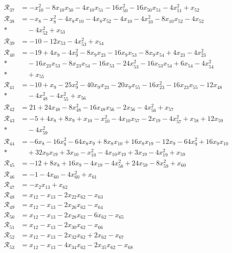 \begin{align*}
\mathcal R_{37} &= -x_{10}^{2} -8x_{10}x_{50} -4x_{10}x_{51} -16x_{50}^{2} -16x_{50}x_{51} -4x_{51}^{2} +x_{52} \\
\mathcal R_{38} &= -x_{8} -x_{8}^{2} -4x_{8}x_{10} -4x_{8}x_{52} -4x_{10} -4x_{10}^{2} -8x_{10}x_{52} -4x_{52} \\*
&\quad -4x_{52}^{2} +x_{53} \\
\mathcal R_{39} &= -10 -12x_{53} -4x_{53}^{2} +x_{54} \\
\mathcal R_{40} &= -19 +4x_{9} -4x_{9}^{2} -8x_{9}x_{23} -16x_{9}x_{53} -8x_{9}x_{54} +4x_{23} -4x_{23}^{2} \\*
&\quad -16x_{23}x_{53} -8x_{23}x_{54} -16x_{53} -24x_{53}^{2} -16x_{53}x_{54} +6x_{54} -4x_{54}^{2} \\*
&\quad +x_{55} \\
\mathcal R_{41} &= -10 +x_{9} -25x_{9}^{2} -40x_{9}x_{23} -20x_{9}x_{55} -16x_{23}^{2} -16x_{23}x_{55} -12x_{48} \\*
&\quad -4x_{48}^{2} -4x_{55}^{2} +x_{56} \\
\mathcal R_{42} &= 21 +24x_{48} -8x_{48}^{2} -16x_{48}x_{56} -2x_{56} -4x_{56}^{2} +x_{57} \\
\mathcal R_{43} &= -5 +4x_{8} +8x_{9} +x_{10} -x_{10}^{2} -4x_{10}x_{57} -2x_{19} -4x_{57}^{2} +x_{58} +12x_{59} \\*
&\quad -4x_{59}^{2} \\
\mathcal R_{44} &= -6x_{8} -16x_{8}^{2} -64x_{8}x_{9} +8x_{8}x_{10} +16x_{8}x_{19} -12x_{9} -64x_{9}^{2} +16x_{9}x_{10} \\*
&\quad +32x_{9}x_{19} +3x_{10} -x_{10}^{2} -4x_{10}x_{19} +3x_{19} -4x_{19}^{2} +x_{59} \\
\mathcal R_{45} &= -12 +8x_{8} +16x_{9} -4x_{19} -4x_{58}^{2} +24x_{59} -8x_{59}^{2} +x_{60} \\
\mathcal R_{46} &= -1 -4x_{60} -4x_{60}^{2} +x_{61} \\
\mathcal R_{47} &= -x_{2}x_{13} +x_{62} \\
\mathcal R_{48} &= x_{12} -x_{13} -2x_{22}x_{62} -x_{63} \\
\mathcal R_{49} &= x_{12} -x_{13} -2x_{26}x_{62} -x_{64} \\
\mathcal R_{50} &= x_{12} -x_{13} -2x_{28}x_{62} -6x_{62} -x_{65} \\
\mathcal R_{51} &= x_{12} -x_{13} -2x_{30}x_{62} -x_{66} \\
\mathcal R_{52} &= x_{12} -x_{13} -2x_{32}x_{62} +2x_{62} -x_{67} \\
\mathcal R_{53} &= x_{12} -x_{13} -4x_{34}x_{62} -2x_{35}x_{62} -x_{68} \\

\end{align*}
